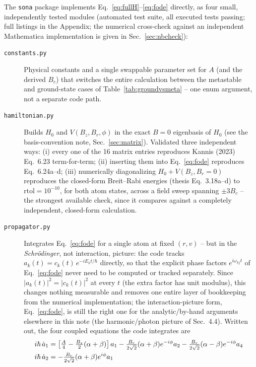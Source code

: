 \documentclass[11pt,a4paper]{article}
\begin{document}
The \texttt{sona} package implements Eq.~\eqref{eq:fullH}--\eqref{eq:fode}
directly, as four small, independently tested modules (automated test
suite, all executed tests passing; full listings in the Appendix; the
numerical cross-check against an independent Mathematica implementation is
given in Sec.~\ref{sec:nbcheck}):

\begin{description}
\item[\texttt{constants.py}] Physical constants and a single swappable
parameter set for $A$ (and the derived $B_c$) that switches the entire
calculation between the metastable and ground-state cases of
Table~\ref{tab:groundvsmeta} -- one enum argument, not a separate code
path.
\item[\texttt{hamiltonian.py}] Builds $H_0$ and $V(B_z,B_r,\phi)$ in the
exact $B{=}0$ eigenbasis of $H_0$ (see the basis-convention note,
Sec.~\ref{sec:matrix}). Validated three independent ways: (i) every one of
the 16 matrix entries reproduces Kannis (2023) Eq.~6.23 term-for-term;
(ii) inserting them into Eq.~\eqref{eq:fode} reproduces Eq.~6.24a--d;
(iii) numerically diagonalizing $H_0+V(B_z,B_r{=}0)$ reproduces the
closed-form Breit--Rabi energies (thesis Eq.~3.18a--d) to $\mathrm{rtol}=10^{-10}$,
for both atom states, across a field sweep spanning $\pm3B_c$ -- the
strongest available check, since it compares against a completely
independent, closed-form calculation.
\item[\texttt{propagator.py}] Integrates Eq.~\eqref{eq:fode} for a single
atom at fixed $(r,v)$ -- but in the \emph{Schr\"odinger}, not interaction,
picture: the code tracks $a_k(t)=c_k(t)\,e^{-iE_kt/\hbar}$ directly, so that
the explicit phase factors $e^{i\omega_{kj}t}$ of Eq.~\eqref{eq:fode} never
need to be computed or tracked separately. Since $|a_k(t)|^2=|c_k(t)|^2$ at
every $t$ (the extra factor has unit modulus), this changes nothing
measurable and removes one entire layer of bookkeeping from the numerical
implementation; the interaction-picture form, Eq.~\eqref{eq:fode}, is
still the right one for the analytic/by-hand arguments elsewhere in this
note (the harmonic/photon picture of Sec.~4.4). Written out, the four
coupled equations the code integrates are
\begin{align}
    i\hbar\,\dot a_1 &= \left[\tfrac{A}{4}-\tfrac{B_z}{2}(\alpha+\beta)\right]a_1
        - \tfrac{B_r}{2\sqrt2}(\alpha+\beta)e^{-i\phi}a_2
        - \tfrac{B_r}{2\sqrt2}(\alpha-\beta)e^{-i\phi}a_4 \notag\\
    i\hbar\,\dot a_2 &= -\tfrac{B_r}{2\sqrt2}(\alpha+\beta)e^{i\phi}a_1

\end{align}
\end{description}
\end{document}
